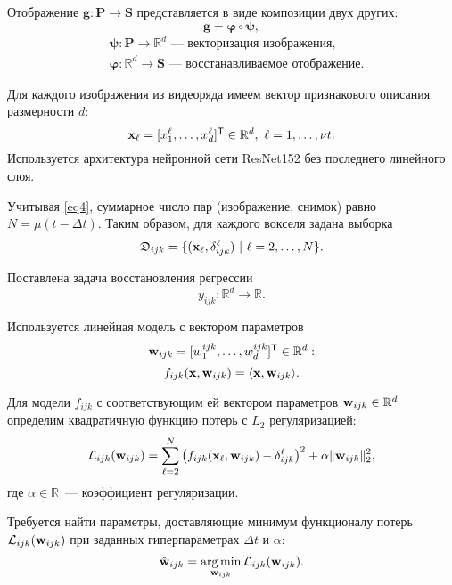 \documentclass[a4paper, 12pt]{extarticle}
\begin{document}
Отображение $\mathbf{g}: \mathbf{P} \to \mathbf{S}$ представляется в виде композиции
двух других:
\[ \mathbf{g} = \bm{\varphi} \circ \bm{\psi}, \]
\vspace{-0.8cm}
\begin{align*}
	 & \bm{\psi}: \mathbf{P} \to \mathbb{R}^d
	\text{~--- векторизация изображения,}        \\
	 & \bm{\varphi}: \mathbb{R}^d \to \mathbf{S}
	\text{~--- восстанавливаемое отображение.}
\end{align*}

Для каждого изображения из видеоряда имеем вектор признакового описания размерности $d$:
\[ \mathbf{x}_{\ell} = [x^{\ell}_1, \ldots, x^{\ell}_{d}]^{\mathsf{T}} \in \mathbb{R}^{d}, \ {\ell} = 1, \ldots, \nu t. \]
Используется архитектура нейронной сети ResNet152 без последнего линейного слоя.

Учитывая \eqref{eq4}, суммарное число пар (изображение, снимок)
равно $N = \mu (t - \Delta t)$. Таким образом, для каждого вокселя задана выборка
\[ \mathfrak{D}_{ijk} = \{(\mathbf{x}_{\ell}, \delta^{\ell}_{ijk}) \ | \ {\ell} = 2, \ldots, N \}. \]

Поставлена задача восстановления регрессии
\begin{equation}
	\label{eq6}
	y_{ijk}: \mathbb{R}^{d} \to \mathbb{R}.
\end{equation}

Используется линейная модель с вектором параметров
\[ \mathbf{w}_{ijk} = [w^{ijk}_1, \ldots, w^{ijk}_{d}]^{\mathsf{T}} \in \mathbb{R}^{d}: \]
\begin{equation}
	\label{eq7}
	f_{ijk}(\mathbf{x}, \mathbf{w}_{ijk}) = \langle \mathbf{x}, \mathbf{w}_{ijk} \rangle.
\end{equation}

Для модели $f_{ijk}$ с соответствующим ей вектором параметров $\mathbf{w}_{ijk} \in \mathbb{R}^{d}$
определим квадратичную функцию потерь с $L_2$ регуляризацией:
\begin{equation}
	\label{eq8}
	\mathcal{L}_{ijk}(\mathbf{w}_{ijk}) = \sum\limits_{\ell = 2}^{N} \big(f_{ijk}(\mathbf{x}_{\ell}, \mathbf{w}_{ijk}) - \delta^{\ell}_{ijk}\big)^2 + \alpha \| \mathbf{w}_{ijk} \|_2^2,
\end{equation}
где $\alpha \in \mathbb{R}$~--- коэффициент регуляризации.

Требуется найти параметры, доставляющие минимум функционалу потерь $\mathcal{L}_{ijk}(\mathbf{w}_{ijk})$
при заданных гиперпараметрах $\Delta t$ и $\alpha$:
\begin{equation}
	\label{eq9}
	\hat{\mathbf{w}}_{ijk} = \operatorname*{arg\,min}_{\mathbf{w}_{ijk}} \mathcal{L}_{ijk}(\mathbf{w}_{ijk}).
\end{equation}
\end{document}
